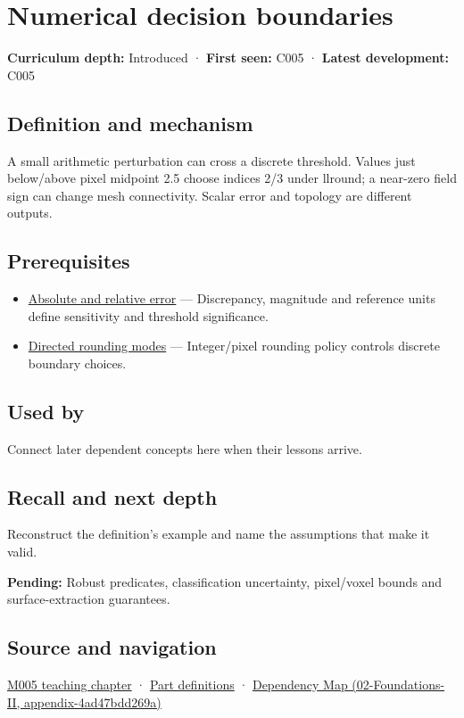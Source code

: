 \hypertarget{appendix-c80db39080be}{}
\section{Numerical decision boundaries}\label{appendix-c80db39080be-numerical-decision-boundaries}

\textbf{Curriculum depth:} Introduced · \textbf{First seen:} C005 · \textbf{Latest development:} C005

\subsection{Definition and mechanism}\label{appendix-c80db39080be-definition-and-mechanism}

A small arithmetic perturbation can cross a discrete threshold. Values just below/above pixel midpoint 2.5 choose indices 2/3 under llround; a near-zero field sign can change mesh connectivity. Scalar error and topology are different outputs.

\subsection{Prerequisites}\label{appendix-c80db39080be-prerequisites}

\begin{itemize}
\tightlist
\item
  \hyperref[appendix-3ae74e89b4e6]{Absolute and relative error} --- Discrepancy, magnitude and reference units define sensitivity and threshold significance.
\item
  \hyperref[appendix-637d164ae5ca]{Directed rounding modes} --- Integer/pixel rounding policy controls discrete boundary choices.
\end{itemize}

\subsection{Used by}\label{appendix-c80db39080be-used-by}

Connect later dependent concepts here when their lessons arrive.

\subsection{Recall and next depth}\label{appendix-c80db39080be-recall-and-next-depth}

Reconstruct the definition's example and name the assumptions that make it valid.

\textbf{Pending:} Robust predicates, classification uncertainty, pixel/voxel bounds and surface-extraction guarantees.

\subsection{Source and navigation}\label{appendix-c80db39080be-source-and-navigation}

\hyperref[01-foundations-i-ch001-when-arithmetic-meets-uncertainty]{M005 teaching chapter} · \hyperref[appendix-fd090d982a15-m005---parts-77-88]{Part definitions} · \href{../02-Foundations-II/main.pdf\#nameddest=appendix-4ad47bdd269a}{Dependency Map (02-Foundations-II, appendix-4ad47bdd269a)}
